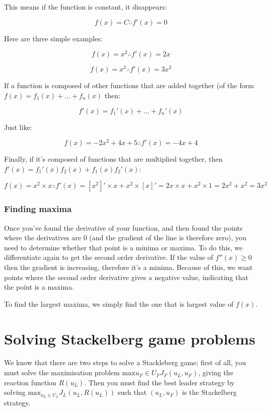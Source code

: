 This means if the function is constant, it disappears:

\[
  f(x) = C \therefore f'(x) = 0
\]

Here are three simple examples:

\[
  f(x) = x^2 \therefore f'(x) = 2x
\]

\[
  f(x) = x^3 \therefore f'(x) = 3x^2
\]

If a function is composed of other functions that are added together (of the
form $f(x) = f_1(x) + \dots + f_n(x)$ then:

\[
  f'(x) = f_1'(x) + \dots + f_n'(x)
\]

Just like:

\[
  f(x) = -2x^2 + 4x + 5 \therefore f'(x) = -4x + 4
\]

Finally, if it's composed of functions that are multiplied together, then
$f'(x)= f_1'(x)f_2(x) + f_1(x)f_2'(x)$:

\[
  f(x) = x^2 \times x \therefore
    f'(x) = [x^2]' \times x + x^2 \times [x]' = 2x \times x + x^2 \times 1
          = 2x^2 + x^2 = 3x^2
\]

\subsubsection{Finding maxima}

Once you've found the derivative of your function, and then found the points
where the derivatives are 0 (and the gradient of the line is therefore zero),
you need to determine whether that point is a minima or maxima. To do this, we
differentiate again to get the second order derivative. If the value of $f''(x)
\geq 0$ then the gradient is increasing, therefore it's a minima. Because of
this, we want points where the second order derivative gives a negative value,
indicating that the point is a maxima.

To find the largest maxima, we simply find the one that is largest value of
$f(x)$.


\section{Solving Stackelberg game problems}

We know that there are two steps to solve a Stackleberg game; first of all, you
must solve the maximisation problem $\text{max}{u_F\in U_F}J_F(u_L,u_F)$, giving
the reaction function $R(u_L)$. Then you must find the best leader strategy by
solving $\text{max}_{u_L \in U_L} J_L(u_L, R(u_L))$ such that $(u_L, u_F)$ is
the Stackelberg strategy.


